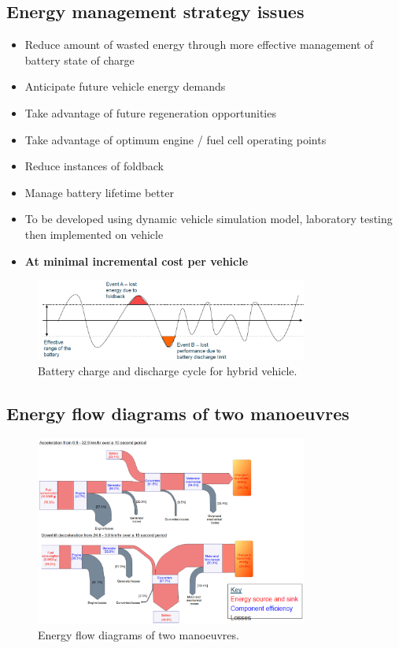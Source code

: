 \subsection{Energy management strategy issues}
\begin{itemize}
    \item Reduce amount of wasted energy through more effective management of battery state of charge
    \item Anticipate future vehicle energy demands
    \item Take advantage of future regeneration opportunities
    \item Take advantage of optimum engine / fuel cell operating points
    \item Reduce instances of foldback
    \item Manage battery lifetime better
    \item To be developed using dynamic vehicle simulation model, laboratory testing then implemented on vehicle
    \item \textbf{At minimal incremental cost per vehicle}
\end{itemize}
\begin{figure}[H]
    \centering
    \includegraphics[width = 0.8\textwidth]{img/figure105.png}
    \caption{Battery charge and discharge cycle for hybrid vehicle.}
\end{figure}
\subsection{Energy flow diagrams of two manoeuvres}
\begin{figure}[H]
    \centering
    \includegraphics[width = 0.8\textwidth]{img/figure106.png}
    \caption{Energy flow diagrams of two manoeuvres.}
\end{figure}
